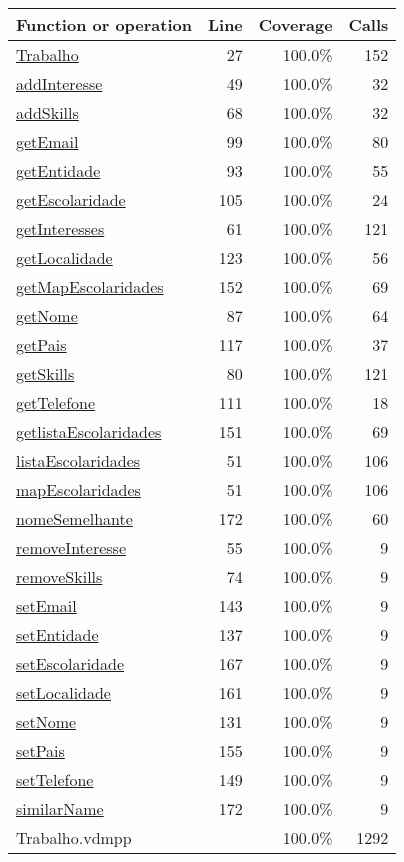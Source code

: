 \begin{longtable}{|l|r|r|r|}
\hline
Function or operation & Line & Coverage & Calls \\
\hline
\hline
\hyperref[Trabalho:27]{Trabalho} & 27&100.0\% & 152 \\
\hline
\hyperref[addInteresse:49]{addInteresse} & 49&100.0\% & 32 \\
\hline
\hyperref[addSkills:68]{addSkills} & 68&100.0\% & 32 \\
\hline
\hyperref[getEmail:99]{getEmail} & 99&100.0\% & 80 \\
\hline
\hyperref[getEntidade:93]{getEntidade} & 93&100.0\% & 55 \\
\hline
\hyperref[getEscolaridade:105]{getEscolaridade} & 105&100.0\% & 24 \\
\hline
\hyperref[getInteresses:61]{getInteresses} & 61&100.0\% & 121 \\
\hline
\hyperref[getLocalidade:123]{getLocalidade} & 123&100.0\% & 56 \\
\hline
\hyperref[getMapEscolaridades:152]{getMapEscolaridades} & 152&100.0\% & 69 \\
\hline
\hyperref[getNome:87]{getNome} & 87&100.0\% & 64 \\
\hline
\hyperref[getPais:117]{getPais} & 117&100.0\% & 37 \\
\hline
\hyperref[getSkills:80]{getSkills} & 80&100.0\% & 121 \\
\hline
\hyperref[getTelefone:111]{getTelefone} & 111&100.0\% & 18 \\
\hline
\hyperref[getlistaEscolaridades:151]{getlistaEscolaridades} & 151&100.0\% & 69 \\
\hline
\hyperref[listaEscolaridades:51]{listaEscolaridades} & 51&100.0\% & 106 \\
\hline
\hyperref[mapEscolaridades:51]{mapEscolaridades} & 51&100.0\% & 106 \\
\hline
\hyperref[nomeSemelhante:172]{nomeSemelhante} & 172&100.0\% & 60 \\
\hline
\hyperref[removeInteresse:55]{removeInteresse} & 55&100.0\% & 9 \\
\hline
\hyperref[removeSkills:74]{removeSkills} & 74&100.0\% & 9 \\
\hline
\hyperref[setEmail:143]{setEmail} & 143&100.0\% & 9 \\
\hline
\hyperref[setEntidade:137]{setEntidade} & 137&100.0\% & 9 \\
\hline
\hyperref[setEscolaridade:167]{setEscolaridade} & 167&100.0\% & 9 \\
\hline
\hyperref[setLocalidade:161]{setLocalidade} & 161&100.0\% & 9 \\
\hline
\hyperref[setNome:131]{setNome} & 131&100.0\% & 9 \\
\hline
\hyperref[setPais:155]{setPais} & 155&100.0\% & 9 \\
\hline
\hyperref[setTelefone:149]{setTelefone} & 149&100.0\% & 9 \\
\hline
\hyperref[similarName:172]{similarName} & 172&100.0\% & 9 \\
\hline
\hline
Trabalho.vdmpp & & 100.0\% & 1292 \\
\hline
\end{longtable}

